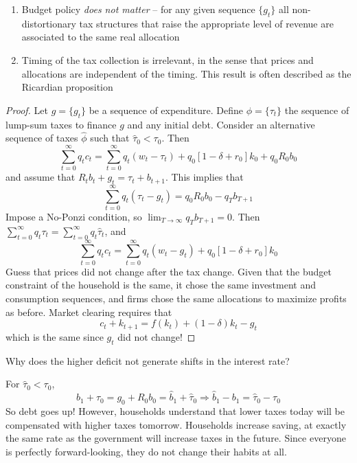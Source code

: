 \documentclass[10pt]{article}
\begin{document}
\begin{theorem}
	
	\begin{enumerate}
	\item Budget policy \emph{does not matter} -- for any given sequence $\{g_t\}$ all non-distortionary tax structures that raise the appropriate level of revenue are associated to the same real allocation
	\item Timing of the tax collection is irrelevant, in the sense that prices and allocations are independent of the timing. This result is often described as the Ricardian proposition
\end{enumerate}
\end{theorem}
\begin{proof}
	Let $g = \{g_t\}$ be a sequence of expenditure. Define $\phi = \{\tau_t\}$ the sequence of lump-sum taxes to finance $g$ and any initial debt. Consider an alternative sequence of taxes $\hat{\phi}$ such that $\hat{\tau}_0 < \tau_0$. Then \[\sum_{t=0}^\infty q_tc_t = \sum_{t=0}^\infty q_t(w_t-\tau_t) + q_0[1-\delta+r_0]k_0 + q_0R_0b_0\]and assume that $R_tb_t+g_t = \tau_t + b_{t+1}$. This implies that \[\sum_{t=0}^\infty q_t(\tau_t - g_t)= q_0R_0b_0 - q_Tb_{T+1}\]Impose a No-Ponzi condition, so $\lim_{T\to\infty} q_Tb_{T+1} = 0$. Then $\sum_{t=0}^\infty q_t\tau_t = \sum_{t=0}^\infty q_t\hat{\tau}_t$, and \[\sum_{t=0}^\infty q_tc_t = \sum_{t=0}^\infty q_t(w_t-g_t) + q_0[1-\delta+r_0]k_0\]Guess that prices did not change after the tax change. Given that the budget constraint of the household is the same, it chose the same investment and consumption sequences, and firms chose the same allocations to maximize profits as before. Market clearing requires that \[c_t + k_{t+1} = f(k_t) + (1-\delta )k_t- g_t\]which is the same since $g_t$ did not change!
\end{proof}

\begin{question}
	Why does the higher deficit not generate shifts in the interest rate?
\end{question}
For $\hat{\tau}_0 < \tau_0$, \[b_1 + \tau_0 = g_0 + R_0b_0 = \hat{b}_1 + \hat{\tau}_0 \Longrightarrow \hat{b}_1 - b_1 = \hat{\tau}_0 - \tau_0\]So debt goes up! However, households understand that lower taxes today will be compensated with higher taxes tomorrow. Households increase saving, at exactly the same rate as the government will increase taxes in the future. Since everyone is perfectly forward-looking, they do not change their habits at all.
\end{document}
